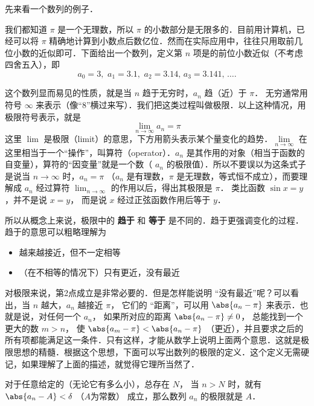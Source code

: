 
先来看一个数列的例子．

\begin{exam}{}
我们都知道 $\pi$ 是一个无理数，所以 $\pi$ 的小数部分是无限多的．目前用计算机，已经可以将 $\pi$ 精确地计算到小数点后数亿位．然而在实际应用中，往往只用取前几位小数的近似即可．下面给出一个数列，定义第 $n$ 项是的前位小数近似（不考虑四舍五入），即
\begin{equation}
{a_0} = 3,\,\,{a_1} = 3.1,\,\,{a_2} = 3.14,\,{a_3} = 3.141,\,\dots.
\end{equation}
\end{exam}

这个数列显而易见的性质，就是当 $n$ 趋于无穷时，$a_n$ 趋（近）于 $\pi$． 无穷通常用符号 $\infty$ 来表示（像“8”横过来写）．我们把这类过程叫做极限．以上这种情况，用极限符号表示，就是
\begin{equation}
\mathop {\lim }\limits_{n \to \infty } {a_n} = \pi 
\end{equation}
这里 $\lim$ 是极限（limit）的意思，下方用箭头表示某个量变化的趋势．$\mathop {\lim }\limits_{n \to \infty }$ 在这里相当于一个“操作”，叫算符（operator）．$a_n$ 是其作用的对象（相当于函数的自变量），算符的“因变量”就是一个数（ $a_n$ 的极限值）．所以不要误以为这条式子是说当 $n \to \infty$ 时，$a_n=\pi$ （$a_n$ 是有理数，$\pi$ 是无理数，等式恒不成立），而要理解成 $a_n$ 经过算符 $\lim_{n \to \infty }$ 的作用以后，得出其极限是 $\pi$． 类比函数 $\sin x = y$，并不是说 $x=y$， 而是说 $x$ 经过正弦函数作用后等于 $y$． 

所以从概念上来说，极限中的 \textbf{趋于} 和 \textbf{等于} 是不同的．趋于更强调变化的过程．趋于的意思可以粗略理解为
\begin{itemize}
\item 越来越接近，但不一定相等
\item （在不相等的情况下）只有更近，没有最近
\end{itemize}

对极限来说，第2点成立是非常必要的．但是怎样能说明 “没有最近”呢？可以看出，当 $n$ 越大，$a_n$ 越接近 $\pi$， 它们的 “距离”，可以用 $\abs{a_n - \pi}$ 来表示．也就是说，对任何一个 $a_n$， 如果所对应的距离 $\abs{a_n - \pi } \ne 0$， 总能找到一个更大的数 $m>n$， 使 $\abs{a_m - \pi} < \abs{a_n - \pi}$ （更近），并且要求之后的所有项都能满足这一条件．只有这样，才能从数学上说明上面两个意思．这就是极限思想的精髓．根据这个思想，下面可以写出数列的极限的定义．这个定义无需硬记，如果理解了上面的描述，就觉得它理所当然了．

对于任意给定的（无论它有多么小），总存在 $N$， 当 $n>N$ 时，就有 $\abs{a_n - A} < \delta $ （$A$为常数） 成立，那么数列 $a_n$ 的极限就是 $A$． 

